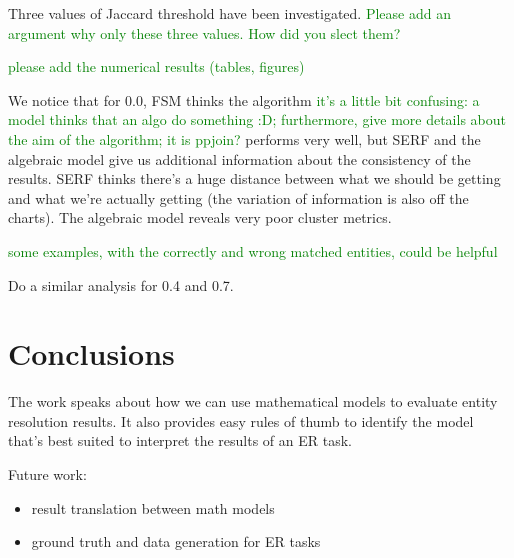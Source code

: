 \documentclass[11pt]{article}
\begin{document}
    Three values of Jaccard threshold have been investigated.
    \textcolor{green}{Please add an argument why only these three values. How did you slect them?} 

    \textcolor{green}{please add the numerical results (tables, figures)}

    We notice that for 0.0, FSM thinks the algorithm 
    \textcolor{green}{it's a little bit confusing: a model thinks that an algo do something :D; furthermore, give more details about the aim of the algorithm; it is ppjoin?} 
    performs very well, but SERF and the algebraic model give us additional information about the consistency of the results. 
    SERF thinks there's a huge distance between what we should be getting and what we're actually getting (the variation of information is also off the charts).
    The algebraic model reveals very poor cluster metrics.

    \textcolor{green}{some examples, with the correctly and wrong matched entities, could be helpful} 

    Do a similar analysis for 0.4 and 0.7.

    \section[conclusion]{Conclusions}\label{section:conclusions}

    The work speaks about how we can use mathematical models to evaluate entity resolution results. It also provides easy rules of thumb to identify the model that's best suited to interpret the results of an ER task.
    
    Future work:
    \begin{itemize}
        \item result translation between math models
        \item ground truth and data generation for ER tasks
    \end{itemize}

    
\end{document}
